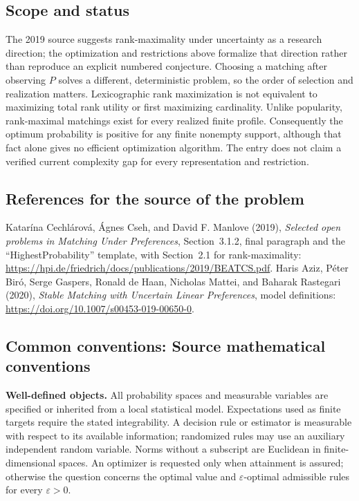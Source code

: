 \documentclass[11pt,a4paper]{article}
\begin{document}
\subsection*{Scope and status}
The 2019 source suggests rank-maximality under uncertainty as a research direction; the optimization and restrictions above formalize that direction rather than reproduce an explicit numbered conjecture. Choosing a matching after observing $P$ solves a different, deterministic problem, so the order of selection and realization matters. Lexicographic rank maximization is not equivalent to maximizing total rank utility or first maximizing cardinality. Unlike popularity, rank-maximal matchings exist for every realized finite profile. Consequently the optimum probability is positive for any finite nonempty support, although that fact alone gives no efficient optimization algorithm. The entry does not claim a verified current complexity gap for every representation and restriction.
\subsection*{References for the source of the problem}
Katar\'ina Cechl\'arov\'a, \'Agnes Cseh, and David F. Manlove (2019), \emph{Selected open problems in Matching Under Preferences}, Section~3.1.2, final paragraph and the ``HighestProbability'' template, with Section~2.1 for rank-maximality: \url{https://hpi.de/friedrich/docs/publications/2019/BEATCS.pdf}. Haris Aziz, P\'eter Bir\'o, Serge Gaspers, Ronald de Haan, Nicholas Mattei, and Baharak Rastegari (2020), \emph{Stable Matching with Uncertain Linear Preferences}, model definitions: \url{https://doi.org/10.1007/s00453-019-00650-0}.

\subsection*{Common conventions: Source mathematical conventions}

\textbf{Well-defined objects.}
All probability spaces and measurable variables are specified or inherited
from a local statistical model. Expectations used as finite targets require
the stated integrability. A decision rule or estimator is measurable with
respect to its available information; randomized rules may use an auxiliary
independent random variable. Norms without a subscript are Euclidean in
finite-dimensional spaces. An optimizer is requested only when attainment
is assured; otherwise the question concerns the optimal value and
$\varepsilon$-optimal admissible rules for every $\varepsilon>0$.
\end{document}
